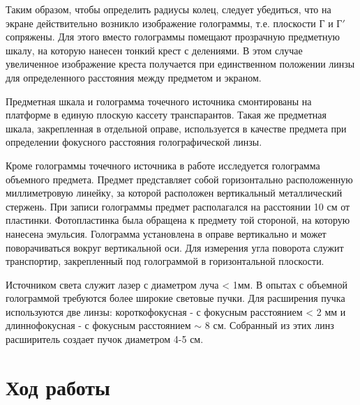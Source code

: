 \documentclass[a4paper,12pt]{article}
\begin{document}
Таким образом, чтобы определить радиусы колец, следует убедиться, что на экране действительно возникло изображение голограммы, т.е. плоскости Г и $\text{Г}'$ сопряжены. Для этого вместо голограммы помещают прозрачную предметную шкалу, на которую нанесен тонкий крест с делениями. В этом случае увеличенное изображение креста получается при единственном положении линзы для определенного расстояния между предметом и экраном.

Предметная шкала и голограмма точечного источника смонтированы на платформе в единую плоскую кассету транспарантов. Такая же предметная шкала, закрепленная в отдельной оправе, используется в качестве предмета при определении фокусного расстояния голографической линзы.

Кроме голограммы точечного источника в работе исследуется голограмма объемного предмета. Предмет представляет собой горизонтально расположенную миллиметровую линейку, за которой расположен вертикальный металлический стержень. При записи голограммы предмет располагался на расстоянии 10 см от пластинки. Фотопластинка была обращена к предмету той стороной, на которую нанесена эмульсия. Голограмма установлена в оправе вертикально и может поворачиваться вокруг вертикальной оси. Для измерения угла поворота служит транспортир, закрепленный под голограммой в горизонтальной плоскости.

Источником света служит лазер с диаметром луча < 1мм. В опытах с объемной голограммой требуются более широкие световые пучки. Для расширения пучка используются две линзы: короткофокусная - с фокусным расстоянием < 2 мм и длиннофокусная - с фокусным расстоянием $\sim$ 8 см. Собранный из этих линз расширитель создает пучок диаметром 4-5 см.

\section{Ход работы}
\end{document}
